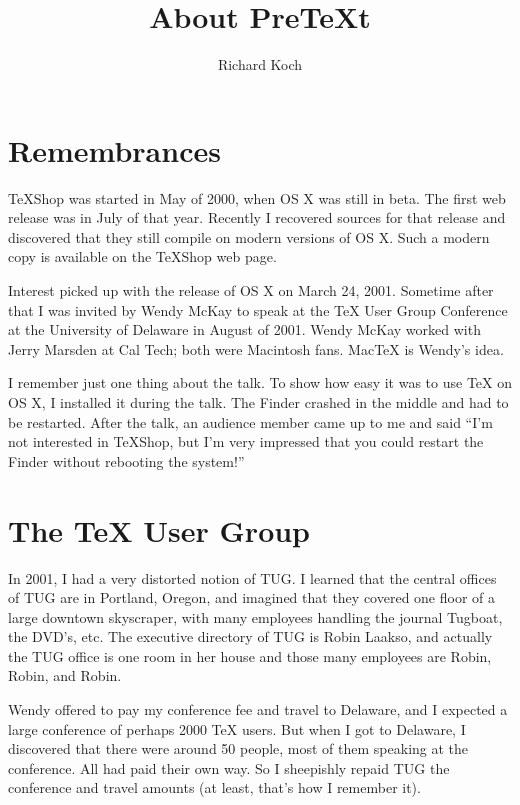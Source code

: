 \documentclass[11pt, oneside]{article}   	%
\title{About PreTeXt}
\author{Richard Koch}
\begin{document}
\maketitle
\section{Remembrances}

TeXShop was started in May of 2000, when OS X was still in beta. The first web release was in July of that year. Recently I recovered sources for that release and discovered that they still compile on modern versions of OS X. Such a modern copy is available on the TeXShop web page.

Interest picked up with the release of OS X on March 24, 2001.  Sometime after that I was invited by Wendy McKay to speak at the TeX User Group Conference at the University of Delaware in  August of 2001. Wendy McKay worked with Jerry Marsden at Cal Tech; both were Macintosh fans.  MacTeX is Wendy's idea.

I remember just one thing about the talk. To show how easy it was to use TeX on OS X, I installed it during the talk. The Finder crashed in the middle and had to be restarted. After the talk, an audience member came up to me and said ``I'm not interested in TeXShop, but I'm very impressed that you could restart the Finder without rebooting the system!''

\section{The TeX User Group}
In 2001, I had a very distorted notion of TUG. I learned that the central offices of TUG are in Portland, Oregon, and imagined that they covered one floor of a large downtown skyscraper, with many employees handling the journal Tugboat, the DVD's, etc. The executive directory of TUG is Robin Laakso, and actually the TUG office is one room in her house and those many employees are Robin, Robin, and Robin.

Wendy offered to pay my conference fee and travel to Delaware, and I expected a large conference of perhaps 2000 TeX users. But when I got to Delaware, I discovered that there were around 50 people, most of them  speaking at the conference. All had paid their own way. So I sheepishly repaid TUG the conference and travel amounts (at least, that's how I remember it).
\end{document}
